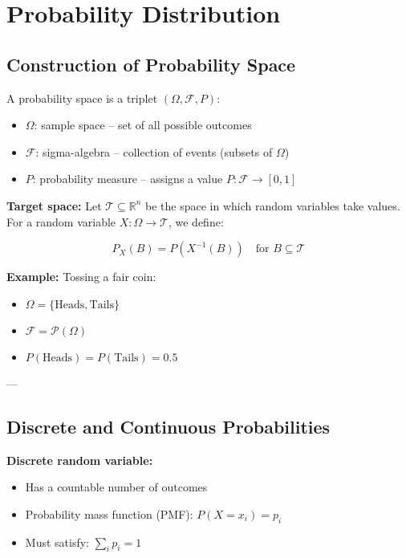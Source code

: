 \section{Probability Distribution}

\subsection{Construction of Probability Space}

A probability space is a triplet \( (\Omega, \mathcal{F}, P) \):

\begin{itemize}
    \item \( \Omega \): sample space – set of all possible outcomes
    \item \( \mathcal{F} \): sigma-algebra – collection of events (subsets of \( \Omega \))
    \item \( P \): probability measure – assigns a value \( P: \mathcal{F} \rightarrow [0,1] \)
\end{itemize}

\textbf{Target space:} Let \( \mathcal{T} \subseteq \mathbb{R}^n \) be the space in which random variables take values.  
For a random variable \( X: \Omega \rightarrow \mathcal{T} \), we define:

\[
P_X(B) = P(X^{-1}(B)) \quad \text{for } B \subseteq \mathcal{T}
\]

\textbf{Example:} Tossing a fair coin:

\begin{itemize}
    \item \( \Omega = \{\text{Heads}, \text{Tails}\} \)
    \item \( \mathcal{F} = \mathcal{P}(\Omega) \)
    \item \( P(\text{Heads}) = P(\text{Tails}) = 0.5 \)
\end{itemize}

---

\subsection{Discrete and Continuous Probabilities}

\textbf{Discrete random variable:}
\begin{itemize}
    \item Has a countable number of outcomes
    \item Probability mass function (PMF): \( P(X = x_i) = p_i \)
    \item Must satisfy: \( \sum_i p_i = 1 \)
\end{itemize}


